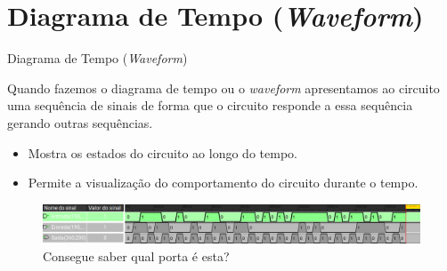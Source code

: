 \section{Diagrama de Tempo (\textit{Waveform})}

\begin{frame}{Diagrama de Tempo (\textit{Waveform})}
	\par Quando fazemos o diagrama de tempo ou o \textit{waveform} apresentamos ao circuito uma sequência de  sinais de forma que o circuito responde a essa sequência gerando outras sequências. 
	\begin{itemize}
		\item Mostra os estados do circuito ao longo do tempo.
		\item Permite a visualização do comportamento do circuito durante o tempo.
	\end{itemize}
	\begin{figure}
		\centering
		\includegraphics[width=\linewidth]{images/waveform01}
		\caption{Consegue saber qual porta é esta?}
		\label{fig:waveform01}
	\end{figure}
\end{frame}

